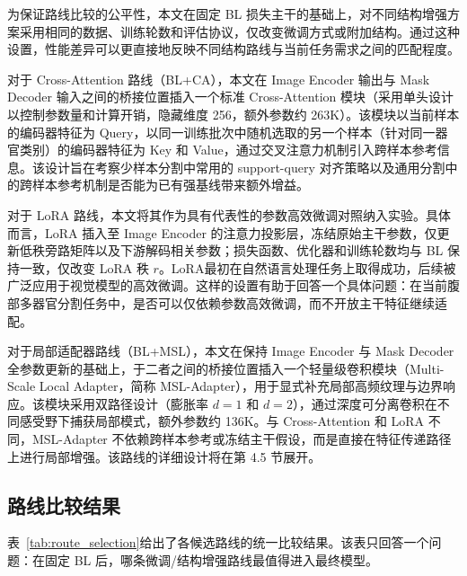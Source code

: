 为保证路线比较的公平性，本文在固定 BL 损失主干的基础上，对不同结构增强方案采用相同的数据、训练轮数和评估协议，仅改变微调方式或附加结构。通过这种设置，性能差异可以更直接地反映不同结构路线与当前任务需求之间的匹配程度。

对于 Cross-Attention 路线（BL+CA），本文在 Image Encoder 输出与 Mask Decoder 输入之间的桥接位置插入一个标准 Cross-Attention 模块（采用单头设计以控制参数量和计算开销，隐藏维度 256，额外参数约 263K）。该模块以当前样本的编码器特征为 Query，以同一训练批次中随机选取的另一个样本（针对同一器官类别）的编码器特征为 Key 和 Value，通过交叉注意力机制引入跨样本参考信息。该设计旨在考察少样本分割中常用的 support-query 对齐策略\cite{wang2019panet}以及通用分割中的跨样本参考机制\cite{butoi2023universeg}是否能为已有强基线带来额外增益。

对于 LoRA 路线，本文将其作为具有代表性的参数高效微调对照纳入实验。具体而言，LoRA 插入至 Image Encoder 的注意力投影层，冻结原始主干参数，仅更新低秩旁路矩阵以及下游解码相关参数；损失函数、优化器和训练轮数均与 BL 保持一致，仅改变 LoRA 秩 $r$。LoRA\cite{hu2022lora}最初在自然语言处理任务上取得成功，后续被广泛应用于视觉模型的高效微调\cite{ding2022peftsurvey}。这样的设置有助于回答一个具体问题：在当前腹部多器官分割任务中，是否可以仅依赖参数高效微调，而不开放主干特征继续适配。

对于局部适配器路线（BL+MSL），本文在保持 Image Encoder 与 Mask Decoder 全参数更新的基础上，于二者之间的桥接位置插入一个轻量级卷积模块（Multi-Scale Local Adapter，简称 MSL-Adapter），用于显式补充局部高频纹理与边界响应。该模块采用双路径设计（膨胀率 $d=1$ 和 $d=2$），通过深度可分离卷积在不同感受野下捕获局部模式，额外参数约 136K。与 Cross-Attention 和 LoRA 不同，MSL-Adapter 不依赖跨样本参考或冻结主干假设，而是直接在特征传递路径上进行局部增强。该路线的详细设计将在第 4.5 节展开。

\subsection{路线比较结果}

表~\ref{tab:route_selection}给出了各候选路线的统一比较结果。该表只回答一个问题：在固定 BL 后，哪条微调/结构增强路线最值得进入最终模型。

